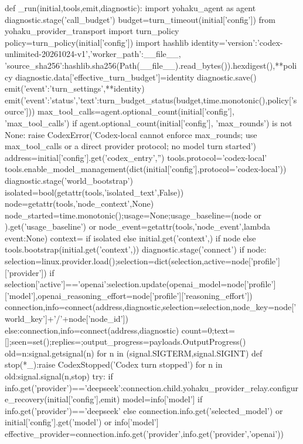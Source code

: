 def _run(initial,tools,emit,diagnostic):
    import yohaku_agent as agent
    diagnostic.stage('call_budget')
    budget=turn_timeout(initial['config'])
    from yohaku_provider_transport import turn_policy
    policy=turn_policy(initial['config'])
    import hashlib
    identity={'version':'codex-unlimited-20261024-v1','worker_path':__file__,
              'source_sha256':hashlib.sha256(Path(__file__).read_bytes()).hexdigest(),**policy}
    diagnostic.data['effective_turn_budget']=identity
    diagnostic.save()
    emit({'event':'turn_settings',**identity})
    emit({'event':'status','text':turn_budget_status(budget,time.monotonic(),policy['source'])})
    max_tool_calls=agent.optional_count(initial['config'], 'max_tool_calls')
    if agent.optional_count(initial['config'], 'max_rounds') is not None:
        raise CodexError('Codex-local cannot enforce max_rounds; use max_tool_calls or a direct provider protocol; no model turn started')
    address=initial['config'].get('codex_entry','')
    tools.protocol='codex-local'
    tools.enable_model_management(dict(initial['config'],protocol='codex-local'))
    diagnostic.stage('world_bootstrap')
    isolated=bool(getattr(tools,'isolated_text',False))
    node=getattr(tools,'node_context',None)
    node_started=time.monotonic();usage=None;usage_baseline=(node or {}).get('usage_baseline') or {}
    node_event=getattr(tools,'node_event',lambda event:None)
    context={} if isolated else initial.get('context',{}) if node else tools.bootstrap(initial.get('context',{}))
    diagnostic.stage('connect')
    if node:
        selection=linux.provider.load();selection=dict(selection,active=node['profile']['provider'])
        if selection['active']=='openai':selection.update(openai_model=node['profile']['model'],openai_reasoning_effort=node['profile']['reasoning_effort'])
        connection,info=connect(address,diagnostic,selection=selection,node_key=node['world_key']+'/'+node['node_id'])
    else:connection,info=connect(address,diagnostic)
    count=0;text=[];seen=set();replies={};output_progress=payloads.OutputProgress()
    old={n:signal.getsignal(n) for n in (signal.SIGTERM,signal.SIGINT)}
    def stop(*_):raise CodexStopped('Codex turn stopped')
    for n in old:signal.signal(n,stop)
    try:
        if info.get('provider')=='deepseek':connection.child.yohaku_provider_relay.configure_recovery(initial['config'],emit)
        model=info['model'] if info.get('provider')=='deepseek' else connection.info.get('selected_model') or initial['config'].get('model') or info['model']
        effective_provider=connection.info.get('provider',info.get('provider','openai'))
